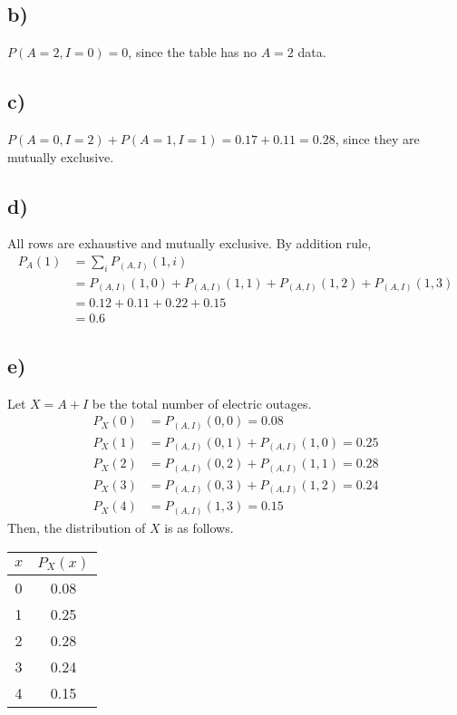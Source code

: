 \documentclass[12pt]{article}
\begin{document}
\subsection*{b)}
$P(A = 2, I = 0) = 0$, since the table has no $A = 2$ data.

\subsection*{c)}
$P(A = 0, I = 2) + P(A = 1, I = 1) = 0.17 + 0.11 = 0.28$, since they are mutually exclusive. 

\subsection*{d)}
All rows are exhaustive and mutually exclusive. By addition rule,
\begin{align*}
    P_A(1) &= \sum_{i} P_{(A, I)}(1, i) \\
             &= P_{(A, I)}(1, 0) + P_{(A, I)}(1, 1) + P_{(A, I)}(1, 2) + P_{(A, I)}(1, 3) \\
             &= 0.12 + 0.11 + 0.22 + 0.15 \\
             &= 0.6
\end{align*}

\subsection*{e)}
Let $X = A + I$ be the total number of electric outages.
\begin{align*}
    P_X(0) &= P_{(A, I)}(0, 0) = 0.08 \\
    P_X(1) &= P_{(A, I)}(0, 1) + P_{(A, I)}(1, 0) = 0.25 \\
    P_X(2) &= P_{(A, I)}(0, 2) + P_{(A, I)}(1, 1) = 0.28 \\
    P_X(3) &= P_{(A, I)}(0, 3) + P_{(A, I)}(1, 2) = 0.24 \\
    P_X(4) &= P_{(A, I)}(1, 3) = 0.15
\end{align*}
Then, the distribution of $X$ is as follows.
\begin{center}
\begin{tabular}{c|c}
    $x$ & $P_X(x)$ \\
    \hline
    0 & 0.08 \\
    1 & 0.25 \\
    2 & 0.28 \\
    3 & 0.24 \\
    4 & 0.15
\end{tabular}
\end{center}
\end{document}
